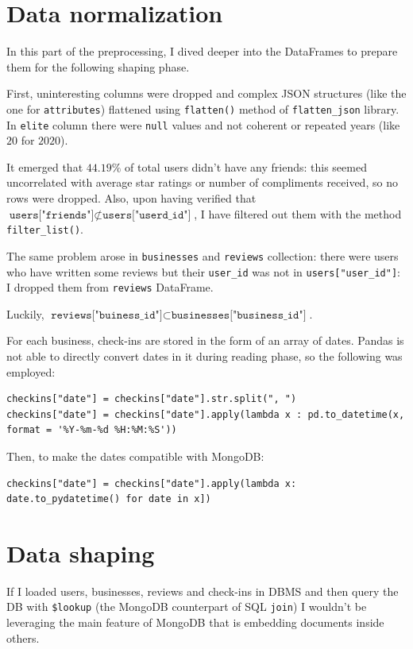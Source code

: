 \documentclass{Configuration_Files/PoliMi3i_thesis}
\begin{document}
\section{Data normalization}
In this part of the preprocessing, I dived deeper into the DataFrames to prepare them for the following shaping phase. 

First, uninteresting columns were dropped and complex JSON structures (like the one for \texttt{attributes}) flattened using \texttt{flatten()} method of \texttt{flatten\_json} library. In \texttt{elite} column there were \texttt{null} values and not coherent or repeated years (like $20$ for $2020$). 

It emerged that $44.19\%$ of total users didn't have any friends: this seemed uncorrelated with average star ratings or number of compliments received, so no rows were dropped. Also, upon having verified that $\texttt{users["friends"]} \not \subset \texttt{users["userd\_id"]}$, I have filtered out them with the method \texttt{filter\_list()}.

The same problem arose in \texttt{businesses} and \texttt{reviews} collection: there were users who have written some reviews but their \texttt{user\_id} was not in \texttt{users["user\_id"]}: I dropped them from \texttt{reviews} DataFrame. 

Luckily, $\texttt{reviews["buiness\_id"]} \subset \texttt{businesses["business\_id"]}$. 

For each business, check-ins are stored in the form of an array of dates. Pandas is not able to directly convert dates in it during reading phase, so the following was employed:

\bigskip

\begin{verbatim}
checkins["date"] = checkins["date"].str.split(", ")
checkins["date"] = checkins["date"].apply(lambda x : pd.to_datetime(x, 
format = '%Y-%m-%d %H:%M:%S'))
\end{verbatim}

\bigskip

Then, to make the dates compatible with MongoDB:
\begin{verbatim}
checkins["date"] = checkins["date"].apply(lambda x: 
date.to_pydatetime() for date in x])
\end{verbatim}

\section{Data shaping}
If I loaded users, businesses, reviews and check-ins in DBMS and then query the DB with \texttt{\$lookup} (the MongoDB counterpart of SQL \texttt{join}) I wouldn't be leveraging the main feature of MongoDB that is embedding documents inside others.
\end{document}
